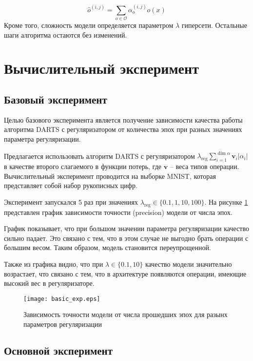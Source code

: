 \documentclass[12pt, twoside]{article}
\begin{document}
 $$\hat{o}^{(i, j)} = \sum_{o\in \mathcal{O}}\alpha^{(i, j)}_oo(x)$$
 Кроме того, сложность модели определяется параметром $\lambda$ гиперсети. Остальные шаги алгоритма остаются без изменений.
 
 \section{Вычислительный эксперимент}
 
 \subsection{Базовый эксперимент}
 Целью базового эксперимента является получение зависимости качества работы алгоритма DARTS с регуляризатором от количества эпох при разных значениях параметра регуляризации.
 
 Предлагается использовать алгоритм DARTS с регуляризатором $\lambda_{\text{reg}}\sum_{i=1}^{\dim\alpha}\mathbf{v}_i|\alpha_i|$ в качестве второго слагаемого в функции потерь, где $\mathbf{v}$ -- веса типов операции. Вычислительный эксперимент проводится на выборке MNIST\cite{lecun-mnisthandwrittendigit-2010}, которая представляет собой набор рукописных цифр.
 
Эксперимент запускался 5 раз при значениях $\lambda_{\text{reg}} \in \{0.1, 1, 10, 100\}$. На рисунке \ref{fig:basic_exp} представлен график зависимости точности (precision) модели от числа эпох.

График показывает, что при большом значении параметра регуляризации качество сильно падает. Это связано с тем, что в этом случае не выгодно брать операции с большим весом. Таким образом, модель становится переупрощенной.

 Также из графика видно, что при $\lambda \in \{0.1, 10\}$ качество модели значительно возрастает, что связано с тем, что в архитектуре появляются операции, имеющие высокий вес в регуляризаторе.

\begin{figure}[H]
\centering
  \texttt{[image: basic\_exp.eps]}
  \caption{Зависимость точности модели от числа прошедших эпох для разынх параметров регуляризации}
  \label{fig:basic_exp}
\end{figure}

\subsection{Основной эксперимент}
\end{document}

